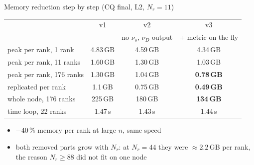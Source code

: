 \begin{frame}{Memory reduction step by step (CQ final, L2, $N_r = 11$)}
    \begin{center}
    \begin{tabular}{lccc}
        \hline
        & v1 & v2 & v3 \\
        & & no $\nu_s$, $\nu_D$ output & + metric on the fly \\
        \hline
        peak per rank, 1 rank      & 4.83\,GB & 4.59\,GB & 4.34\,GB \\
        peak per rank, 11 ranks    & 1.60\,GB & 1.30\,GB & 1.03\,GB \\
        peak per rank, 176 ranks   & 1.30\,GB & 1.04\,GB & \textbf{0.78\,GB} \\
        replicated per rank        & 1.1\,GB  & 0.75\,GB & \textbf{0.49\,GB} \\
        whole node, 176 ranks      & 225\,GB  & 180\,GB  & \textbf{134\,GB} \\
        time loop, 22 ranks        & 1.47\,s  & 1.43\,s  & 1.44\,s \\
        \hline
    \end{tabular}
    \end{center}
    \vspace{0.5em}
    \begin{itemize}
        \item $-40\,\%$ memory per rank at large $n$, same speed
        \item both removed parts grow with $N_r$: at $N_r = 44$ they were
              $\approx 2.2$\,GB per rank, the reason $N_r \geq 88$ did not fit on one node
    \end{itemize}
\end{frame}

